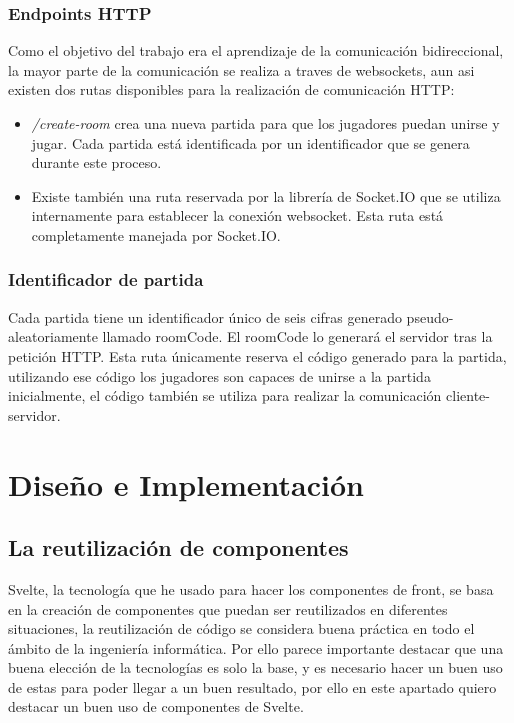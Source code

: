 \subsubsection{Endpoints HTTP}
Como el objetivo del trabajo era el aprendizaje de la comunicación bidireccional, la mayor parte de la comunicación se realiza a traves de websockets, aun asi existen dos rutas disponibles para la realización de comunicación HTTP:

\begin{itemize}
	\item \textit{/create-room} crea una nueva partida para que los jugadores puedan unirse y jugar. Cada partida está identificada por un identificador que se genera durante este proceso.
	\item Existe también una ruta reservada por la librería de Socket.IO que se utiliza internamente para establecer la conexión websocket. Esta ruta está completamente manejada por Socket.IO.
\end{itemize}

\subsubsection{Identificador de partida}
Cada partida tiene un identificador único de seis cifras generado pseudo-aleatoriamente llamado roomCode. El roomCode lo generará el servidor tras la petición HTTP. Esta ruta únicamente reserva el código generado para la partida, utilizando ese código los jugadores son capaces de unirse a la partida inicialmente, el código también se utiliza para realizar la comunicación cliente-servidor.


\section{Diseño e Implementación}

\subsection{La reutilización de componentes}
Svelte, la tecnología que he usado para hacer los componentes de front, se basa en la creación de componentes que puedan ser reutilizados en diferentes situaciones, la reutilización de código se considera buena práctica en todo el ámbito de la ingeniería informática. Por ello parece importante destacar que una buena elección de la tecnologías es solo la base, y es necesario hacer un buen uso de estas para poder llegar a un buen resultado, por ello en este apartado quiero destacar un buen uso de componentes de Svelte.

